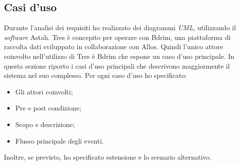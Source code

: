\newpage
\subsection{Casi d'uso}
Durante l'analisi dei requisiti ho realizzato dei diagrammi \emph{UML}, utilizzando il \emph{software} Astah. Tres è concepito per operare con Bdrim, una piattaforma di raccolta dati sviluppato in collaborazione con Allos. Quindi l'unico attore coinvolto nell'utilizzo di Tres è Bdrim che espone un caso d'uso principale. In questa sezione riporto i casi d'uso principali che descrivono maggiormente il sistema nel suo complesso. Per ogni caso d'uso ho specificato: 
\begin{itemize}
\item Gli attori coinvolti;
\item Pre e post condizione;
\item Scopo e descrizione;
\item Flusso principale degli eventi.
\end{itemize}
Inoltre, se previsto, ho specificato estensione e lo scenario alternativo.
\newpage
